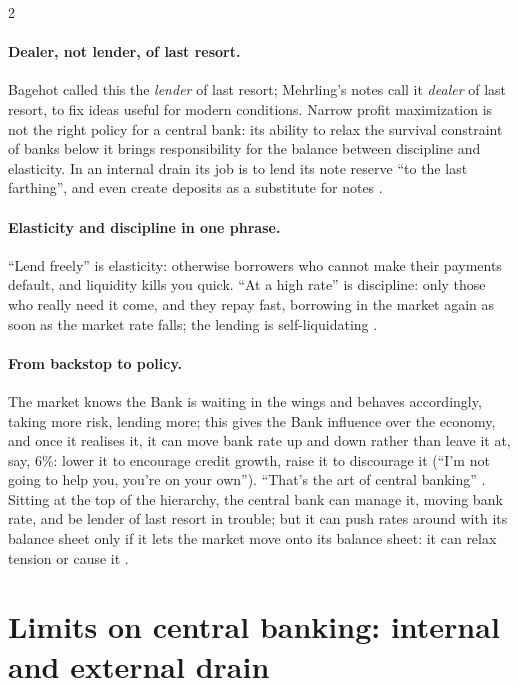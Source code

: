 \begin{paracol}{2}
\paragraph{Dealer, not lender, of last resort.} Bagehot called this the \emph{lender} of last resort; Mehrling's notes call it \emph{dealer} of last resort, to fix ideas useful for modern
conditions. Narrow profit maximization is not the right policy for a central bank: its ability to relax the survival constraint of banks below it brings responsibility for the balance between
discipline and elasticity. In an internal drain its job is to lend its note reserve ``to the last farthing'', and even create deposits as a substitute for notes .

\paragraph{Elasticity and discipline in one phrase.} ``Lend freely'' is elasticity: otherwise borrowers who cannot make their payments default, and liquidity kills you quick. ``At a high
rate'' is discipline: only those who really need it come, and they repay fast, borrowing in the market again as soon as the market rate falls; the lending is self-liquidating
.

\paragraph{From backstop to policy.} The market knows the Bank is waiting in the wings and behaves accordingly, taking more risk, lending more; this gives the Bank influence over the
economy, and once it realises it, it can move bank rate up and down rather than leave it at, say, 6\%: lower it to encourage credit growth, raise it to discourage it (``I'm not going to help
you, you're on your own''). ``That's the art of central banking'' . Sitting at the top of the hierarchy, the central bank can manage it,
moving bank rate, and be lender of last resort in trouble; but it can push rates around with its balance sheet only if it lets the market move onto its balance sheet: it can relax tension or
cause it .

\section{Limits on central banking: internal and external drain}\label{sec:bg-limits}


\end{paracol}

